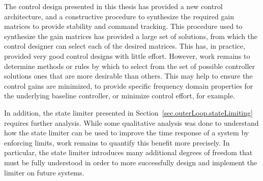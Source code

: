 The control design presented in this thesis has provided a new control architecture, and a constructive procedure to synthesize the required gain matrices to provide stability and command tracking.
This procedure used to synthesize the gain matrices has provided a large set of solutions, from which the control designer can select each of the desired matrices.
This has, in practice, provided very good control designs with little effort.
However, work remains to determine methods or rules by which to select from the set of possible controller solutions ones that are more desirable than others.
This may help to ensure the control gains are minimized, to provide specific frequency domain properties for the underlying baseline controller, or minimize control effort, for example.

In addition, the state limiter presented in Section~\ref{sec.outerLoop.stateLimiting} requires further analysis.
While some qualitative analysis was done to understand how the state limiter can be used to improve the time response of a system by enforcing limits, work remains to quantify this benefit more precisely.
In particular, the state limiter introduces many additional degrees of freedom that must be fully understood in order to more successfully design and implement  the limiter on future systems.
